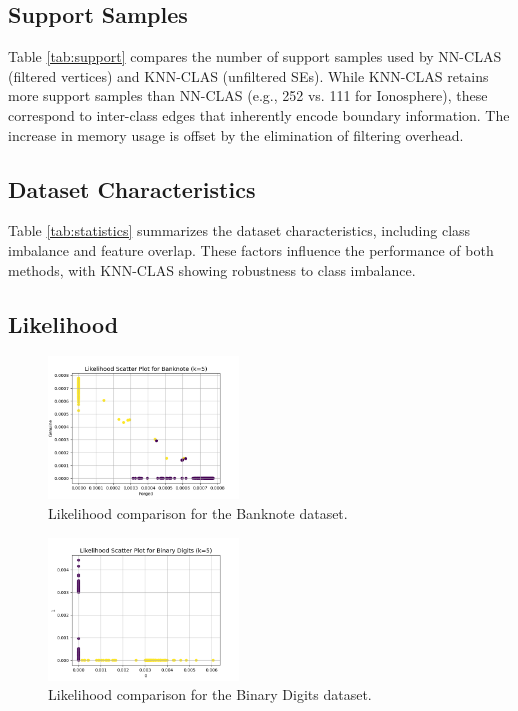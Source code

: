 \documentclass[conference]{IEEEtran}
\begin{document}
\subsection{Support Samples}

Table \ref{tab:support} compares the number of support samples used by NN-CLAS (filtered vertices) and KNN-CLAS (unfiltered SEs). While KNN-CLAS retains more support samples than NN-CLAS (e.g., 252 vs. 111 for Ionosphere), these correspond to inter-class edges that inherently encode boundary information. The increase in memory usage is offset by the elimination of filtering overhead.

\subsection{Dataset Characteristics}

Table \ref{tab:statistics} summarizes the dataset characteristics, including class imbalance and feature overlap. These factors influence the performance of both methods, with KNN-CLAS showing robustness to class imbalance.

\subsection{Likelihood}

\begin{figure}[htbp]
    \centering
    \includegraphics[width=0.45\textwidth]{../scripts/comparison_results/Banknote_likelihoodk5.png}
    \caption{Likelihood comparison for the Banknote dataset.}
    \label{fig:banknote_likelihood}
\end{figure}

\begin{figure}[htbp]
    \centering
    \includegraphics[width=0.45\textwidth]{../scripts/comparison_results/Binary Digits_likelihoodk5.png}
    \caption{Likelihood comparison for the Binary Digits dataset.}
    \label{fig:binary_digits_likelihood}
\end{figure}
\end{document}
